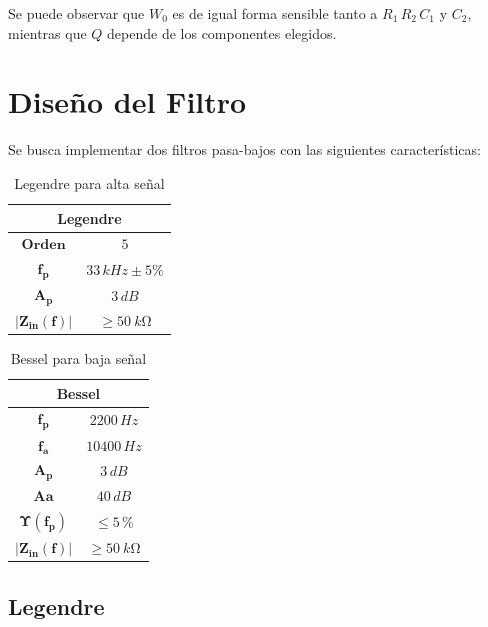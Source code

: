 \documentclass[11pt, a4paper]{article}
\begin{document}
	Se puede observar que $W_0$ es de igual forma sensible tanto a $R_1 \, R_2 \, C_1$ y $C_2$, mientras que $Q$ depende de los componentes elegidos.
	
\section{Diseño del Filtro}

	Se busca implementar dos filtros pasa-bajos con las siguientes características:
\begin{table}[H]
\centering
\begin{tabular}{|c|c|}
\hline
\multicolumn{2}{|c|}{\textbf{Legendre}} \\ \hline
$\mathbf{Orden}$        & $5$             \\ \hline
$\mathbf{f_p}$          & $33 \, kHz \pm 5 \% $          \\ \hline
$\mathbf{A_p}$          & $3 \, dB$          \\ \hline
$\mathbf{|Z_{in}(f)|}$  & $ \geq \SI{50}{k\ohm}$          \\ \hline
\end{tabular}
\caption{Legendre para alta señal}
\label{tabla:legendre}
\end{table}

\begin{table}[H]
\centering
\begin{tabular}{|c|c|}
\hline
\multicolumn{2}{|c|}{\textbf{Bessel}} \\ \hline
$\mathbf{f_p}$           & $2200 \, Hz$             \\ \hline
$\mathbf{f_a}$           & $10400 \, Hz$          \\ \hline
$\mathbf{A_p}$           & $3 \, dB$          \\ \hline
$\mathbf{Aa}$           & $40 \, dB$          \\ \hline
$\mathbf{\Upsilon(f_p)}$           & $\leq 5 \, \% $             \\ \hline
$\mathbf{|Z_{in}(f)|}$          & $\geq \SI{50}{k\ohm}$             \\ \hline
\end{tabular}
\caption{Bessel para baja señal}
\label{tabla:bessel}
\end{table}

\subsection{Legendre}
\end{document}
